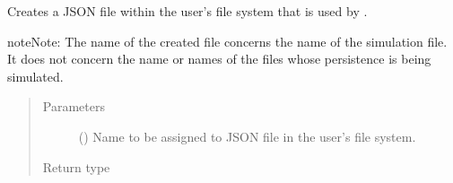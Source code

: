 \documentclass[letterpaper,10pt,english]{sphinxmanual}
\begin{document}
\begin{fulllineitems}
\label{\detokenize{app:app.simfile_generator.main}}
Creates a JSON file within the user’s file system that is used by
.

\begin{sphinxadmonition}{note}{Note:}
The name of the created file concerns the name of the simulation file.
It does not concern the name or names of the files whose persistence
is being simulated.
\end{sphinxadmonition}
\begin{quote}\begin{description}
\item[{Parameters}] \leavevmode
{} () \textendash{} Name to be assigned to JSON file in the user’s file system.

\item[{Return type}] \leavevmode
{}

\end{description}\end{quote}

\end{fulllineitems}

\end{document}
